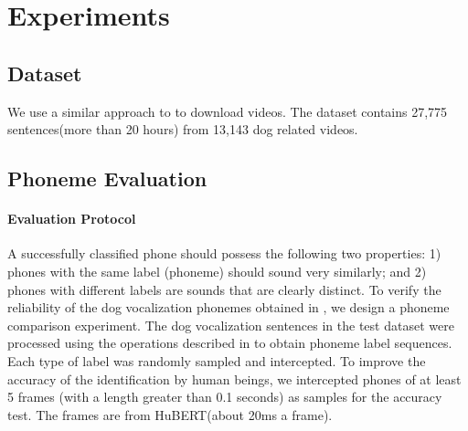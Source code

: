 \section{Experiments}
\label{sec:exp}

\subsection{Dataset}

We use a similar approach to \citet{wang2023towards} to download videos. The dataset contains 27,775 sentences(more than 20 hours) from 13,143 dog related videos.

\subsection{Phoneme Evaluation}

\paragraph{Evaluation Protocol}

A successfully classified phone should possess the following two properties: 1) phones with the same label (phoneme) should sound very similarly; 
and 2) phones with different labels are sounds that are clearly distinct. 
To verify the reliability of the dog vocalization phonemes obtained in 
, we design a phoneme comparison experiment.
The dog vocalization sentences in the test dataset were processed using 
the operations described in  to obtain phoneme label 
sequences. Each type of label was randomly sampled and intercepted. 
To improve the accuracy of the identification by human beings, 
we intercepted phones of at least 5 frames
(with a length greater than 0.1 seconds) as samples for the accuracy test. The frames are from HuBERT(about 20ms a frame). 


